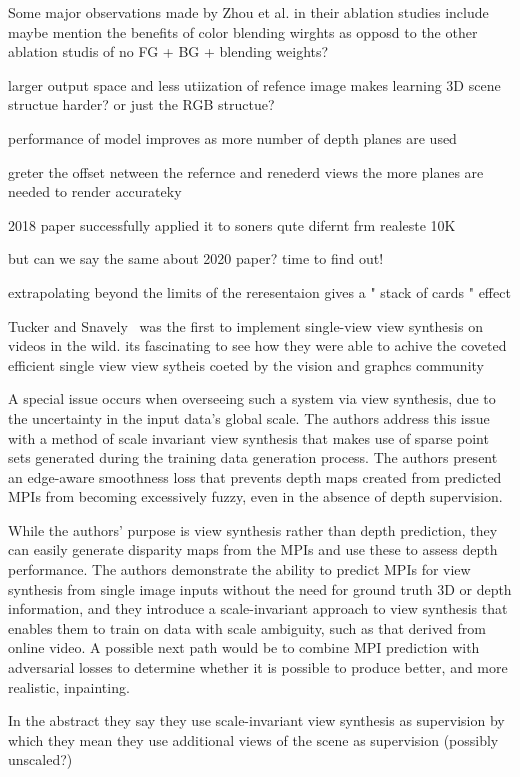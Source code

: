 Some major observations made by Zhou et al. in their ablation studies include 
maybe mention the benefits of color blending wirghts as opposd to the other ablation studis of no FG + BG + blending weights?

larger output space and less utiization of refence image makes learning 3D scene structue harder? or just the RGB structue?

performance of model improves as more number of depth planes are used

greter the offset netween the refernce and renederd views the more planes are needed to render accurateky

2018 paper successfully applied it to soners qute difernt frm realeste 10K 

but can we say the same about 2020 paper? time to find out!

extrapolating beyond the limits of the reresentaion gives a " stack of cards " effect 


Tucker and Snavely~\cite{single_view_mpi} was the first to implement single-view view synthesis on videos in the wild.
its fascinating to see how they were able to achive the coveted efficient single view view sytheis coeted by the vision and graphcs community 

A special issue occurs when overseeing such a system via view synthesis, due to the uncertainty in the input data's global scale. The authors address this issue with a method of scale invariant view synthesis that makes use of sparse point sets generated during the training data generation process. The authors present an edge-aware smoothness loss that prevents depth maps created from predicted MPIs from becoming excessively fuzzy, even in the absence of depth supervision.

While the authors' purpose is view synthesis rather than depth prediction, they can easily generate disparity maps from the MPIs and use these to assess depth performance. The authors demonstrate the ability to predict MPIs for view synthesis from single image inputs without the need for ground truth 3D or depth information, and they introduce a scale-invariant approach to view synthesis that enables them to train on data with scale ambiguity, such as that derived from online video. A possible next path would be to combine MPI prediction with adversarial losses to determine whether it is possible to produce better, and more realistic, inpainting.


In the abstract they say they use scale-invariant view synthesis as supervision by which they mean they use additional views of the scene  as supervision (possibly unscaled?)


